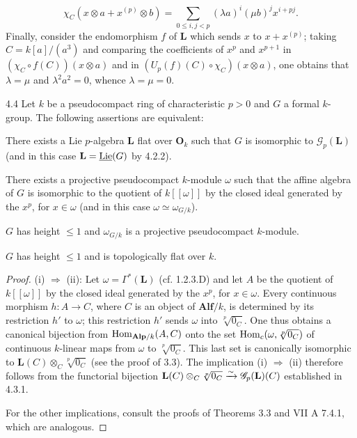 \[
\chi_C(x\otimes a+x^{(p)}\otimes b)=\sum_{0\le i,j<p}(\lambda a)^i(\mu b)^jx^{i+pj}.
\]
\footnotemark[138]Finally, consider the endomorphism $f$ of $\mathbf L$ which sends $x$ to $x+x^{(p)}$; taking $C=k[a]/(a^3)$ and comparing the coefficients of $x^p$ and $x^{p+1}$ in $(\chi_C\circ f(C))(x\otimes a)$ and in $(U_p(f)(C)\circ\chi_C)(x\otimes a)$, one obtains that $\lambda=\mu$ and $\lambda^2a^2=0$, whence $\lambda=\mu=0$.

\begin{theorem}{4.4}\label{VIIB.4.4}
Let $k$ be a pseudocompact ring of characteristic $p>0$ and $G$ a formal $k$-group. The following assertions are equivalent:
\begin{enumeratei}
\item There exists a Lie $p$-algebra $\mathbf L$ flat over $\mathbf O_k$ such that $G$ is isomorphic to $\mathscr G_p(\mathbf L)$ (and in this case $\mathbf L=\underline{\operatorname{Lie}}(G)$ by 4.2.2).
\item There exists a projective pseudocompact $k$-module $\omega$ such that the affine algebra of $G$ is isomorphic to the quotient of $k[[\omega]]$ by the closed ideal generated by the $x^p$, for $x\in\omega$ (and in this case $\omega\simeq\omega_{G/k}$).
\item $G$ has height $\le1$ and $\omega_{G/k}$ is a projective pseudocompact $k$-module.
\item $G$ has height $\le1$ and is topologically flat over $k$.
\end{enumeratei}
\end{theorem}
\begin{proof}
(i) $\Rightarrow$ (ii): Let $\omega=\Gamma^*(\mathbf L)$ (cf. 1.2.3.D) and let $A$ be the quotient of $k[[\omega]]$ by the closed ideal generated by the $x^p$, for $x\in\omega$. Every continuous morphism $h:A\to C$, where $C$ is an object of $\mathbf{Alf}/k$, is determined by its restriction $h'$ to $\omega$; this restriction $h'$ sends $\omega$ into $\sqrt[p]{0_C}$. One thus obtains a canonical bijection from $\operatorname{Hom}_{\mathbf{Alp}/k}(A,C)$ onto the set $\operatorname{Hom}_c(\omega,\sqrt[p]{0_C})$ of continuous $k$-linear maps from $\omega$ to $\sqrt[p]{0_C}$. This last set is canonically isomorphic to $\mathbf L(C)\otimes_C\sqrt[p]{0_C}$ (see the proof of 3.3). The implication (i) $\Rightarrow$ (ii) therefore follows from the functorial bijection $\mathbf L(C)\otimes_C\sqrt[p]{0_C}\xrightarrow{\sim}\mathscr G_p(\mathbf L)(C)$ established in 4.3.1.

For the other implications, consult the proofs of Theorems 3.3 and VII A 7.4.1, which are analogous.
\end{proof}
